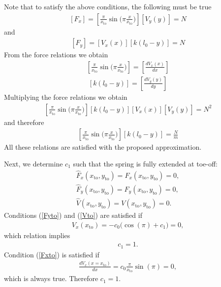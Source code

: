 \documentclass[journal,12pt,onecolumn]{IEEEtran}
\begin{document}
Note that to satisfy the above conditions, the following must be true
\begin{align} \nonumber
	[F_x] = [\frac{\pi}{x_{\text{to}}}\sin\Big(\pi\frac{x}{x_\text{to}}\Big)][V_y(y)]=N
\end{align}
and
\begin{align} \nonumber
	[F_y] = [V_x(x)] [k(l_0-y)]=N
\end{align}
From the force relations we obtain
\begin{align} \nonumber
[\frac{\pi}{x_{\text{to}}}\sin\Big(\pi\frac{x}{x_\text{to}}\Big)]=[\frac{dV_x(x)}{dx}]
\end{align}
\begin{align} \nonumber
[k(l_0-y)]=[\frac{dV_y(y)}{dy}]
\end{align}
Multiplying the force relations we obtain
\begin{align} \nonumber
	[\frac{\pi}{x_{\text{to}}}\sin\Big(\pi\frac{x}{x_\text{to}}\Big)]	[k(l_0-y)] [V_x(x)] [V_y(y)]=N^2
\end{align}
and therefore
\begin{align} \nonumber
	[\frac{\pi}{x_{\text{to}}}\sin\Big(\pi\frac{x}{x_\text{to}}\Big)]	[k(l_0-y)] = \frac{N}{m}
\end{align}
All these relations are satisfied with the proposed approximation.

Next, we determine $c_1$ such that the spring is fully extended at toe-off:
\begin{align}\label{Fxto}
	\hat{F}_x(x_\text{to},y_\text{to}) =  F_x(x_\text{to},y_\text{to}) =0 ,\\ \label{Fyto}
	\hat{F}_y(x_\text{to},y_\text{to}) =
	F_y(x_\text{to},y_\text{to}) =0, \\ \label{Vto}
	\hat{V}(x_\text{to},y_\text{to}) =
	V(x_\text{to},y_\text{to}) =0.
\end{align}
Conditions (\ref{Fyto}) and (\ref{Vto}) are satisfied if
\begin{align}
	V_x(x_\text{to}) = -c_0 \Big(\cos(\pi)+ c_1 \Big) = 0,
\end{align}
which relation implies
\begin{align}
	\label{c1}
	c_1 = 1.
\end{align}
Condition (\ref{Fxto}) is satisfied if
\begin{align}
\frac{dV_x(x = x_{\text{to}})}{dx} = c_0 \frac{\pi}{x_{\text{to}}} \sin(\pi) = 0,
\end{align}
which is always true.
Therefore $c_1=1$.
\end{document}
